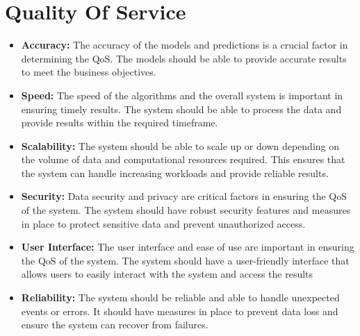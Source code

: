 \section{Quality Of Service}
\justify \quad
\begin{itemize}
    \item \textbf {Accuracy:} The accuracy of the models and predictions is a crucial factor in determining the QoS. The models should be able to provide accurate results to meet the business objectives.
    \item \textbf {Speed:} The speed of the algorithms and the overall system is important in ensuring timely results. The system should be able to process the data and provide results within the required timeframe.
    \item \textbf {Scalability:} The system should be able to scale up or down depending on the volume of data and computational resources required. This ensures that the system can handle increasing workloads and provide reliable results.
    \item \textbf {Security:} Data security and privacy are critical factors in ensuring the QoS of the system. The system should have robust security features and measures in place to protect sensitive data and prevent unauthorized access.
    \item \textbf {User Interface:} The user interface and ease of use are important in ensuring the QoS of the system. The system should have a user-friendly interface that allows users to easily interact with the system and access the results
    \item \textbf {Reliability:} The system should be reliable and able to handle unexpected events or errors. It should have measures in place to prevent data loss and ensure the system can recover from failures.
\end{itemize}

